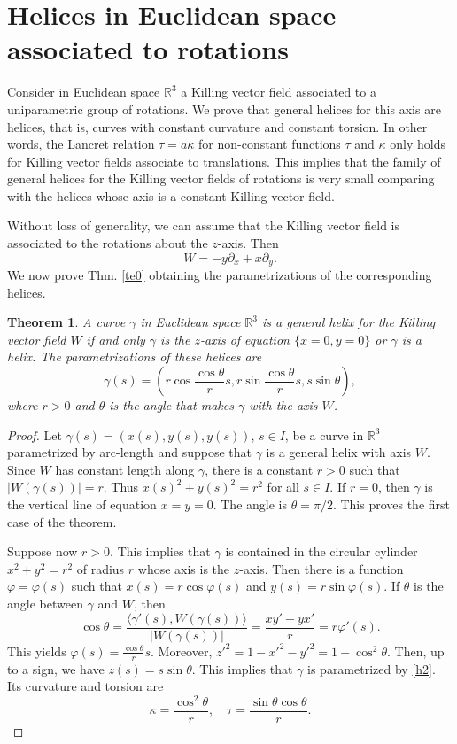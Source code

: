\documentclass[a4paper,12pt]{amsart}
\newtheorem{theorem}{Theorem}[section]
\theoremstyle{definition}
\def\r{\mathbb R}
\begin{document}
\section{Helices in Euclidean space associated to rotations}\label{s2}

Consider in Euclidean space $\r^3$ a Killing vector field associated to a uniparametric group of rotations. We  prove that general helices for this axis are  helices, that is, curves with constant curvature and constant torsion. In other words, the Lancret relation $\tau=a\kappa$ for non-constant functions $\tau$ and $\kappa$ only holds for Killing vector fields associate to translations.  This implies that the family of general helices for the Killing vector fields of rotations is very small comparing with the helices whose axis is a constant Killing vector field. 

Without loss of generality, we can assume that the Killing vector field is associated to   the rotations about the $z$-axis. Then 
\begin{equation}\label{ww}
W=-y\partial_x+x\partial_y.
\end{equation}
We now prove Thm. \ref{te0} obtaining the parametrizations of the corresponding helices.

\begin{theorem} \label{te01}
A curve $\gamma$ in  Euclidean space $\r^3$ is a general helix for the Killing vector field $W$   if and only $\gamma$   is the $z$-axis    of equation $\{x=0,y=0\}$  or $\gamma$ is a helix. The parametrizations of these helices are
\begin{equation}\label{h2}
\gamma(s)=(r\cos\frac{\cos\theta}{r} s,r\sin \frac{\cos\theta}{r} s,s\sin\theta),
\end{equation}
where $r>0$ and $\theta$ is the angle that makes $\gamma$ with the axis $W$.
\end{theorem} 

\begin{proof} 
Let $\gamma(s)=(x(s),y(s),y(s))$, $s\in I$, be a curve in $\r^3$ parametrized by arc-length and suppose that $\gamma$ is a general helix with axis $W$.  Since $W$ has constant length along $\gamma$, there is a constant $r>0$ such that $|W(\gamma(s))|=r$. Thus $x(s)^2+y(s)^2=r^2$ for all $s\in I$. If $r=0$, then $\gamma$ is the vertical line of equation $x=y=0$. The angle is $\theta=\pi/2$. This proves the first case of the theorem.

Suppose now $r>0$. This implies that $\gamma$ is contained in the circular cylinder $x^2+y^2=r^2$ of radius $r$   whose axis is the $z$-axis. Then there is a function $\varphi=\varphi(s)$ such that $x(s)=r\cos\varphi(s)$ and $y(s)=r\sin\varphi(s)$.    If $\theta$ is the angle between $\gamma$ and $W$, then 
$$\cos\theta=\frac{\langle \gamma'(s),W(\gamma(s))\rangle}{|W(\gamma(s))|}=\frac{xy'-yx'}{r}=r\varphi'(s).$$
This yields $\varphi(s)=\frac{\cos\theta}{r} s$. Moreover, $z'^2=1-x'^2-y'^2=1-\cos^2\theta$. Then, up to a sign, 
we have $z(s)=s\sin\theta$. This implies that $\gamma$ is parametrized by \eqref{h2}.   Its curvature and torsion are
$$\kappa=\frac{\cos^2\theta}{r},\quad \tau=\frac{\sin\theta\cos\theta}{r}.$$
\end{proof}
\end{document}
